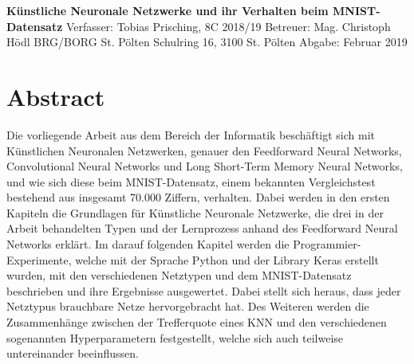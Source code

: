 \documentclass[a4paper,12pt,ngerman,oneside]{scrreprt}	%
\begin{document}
	

	\begin{titlepage}\label{Titleseite}
		
		\vspace*{80mm}\Huge\centering\textbf{Künstliche Neuronale Netzwerke \newline und ihr Verhalten beim MNIST-Datensatz\break}
		\vspace{0mm}\hrulefill
		\vspace{7mm}\Large{\break Verfasser: Tobias Prisching, 8C 2018/19 \break Betreuer: Mag. Christoph Hödl}
		\vspace{15mm}\Large{\break BRG/BORG St. Pölten \break Schulring 16, 3100 St. Pölten}
		\vspace{70mm}\Large{\break Abgabe: Februar 2019}
		
	\end{titlepage}
	
	
	\renewcommand{\abstractname}{Abstract}	
	\chapter*{Abstract}\label{Abstract}
		Die vorliegende Arbeit aus dem Bereich der Informatik beschäftigt sich mit Künstlichen Neuronalen Netzwerken, genauer den Feedforward Neural Networks, Convolutional Neural Networks und Long Short-Term Memory Neural Networks, und wie sich diese beim MNIST-Datensatz, einem bekannten Vergleichstest bestehend aus insgesamt 70.000 Ziffern, verhalten. Dabei werden in den ersten Kapiteln die Grundlagen für Künstliche Neuronale Netzwerke, die drei in der Arbeit behandelten Typen und der Lernprozess anhand des Feedforward Neural Networks erklärt. Im darauf folgenden Kapitel werden die Programmier-Experimente, welche mit der Sprache Python und der Library Keras erstellt wurden, mit den verschiedenen Netztypen und dem MNIST-Datensatz beschrieben und ihre Ergebnisse ausgewertet. Dabei stellt sich heraus, dass jeder Netztypus brauchbare Netze hervorgebracht hat. Des Weiteren werden die Zusammenhänge zwischen der Trefferquote eines KNN und den verschiedenen sogenannten Hyperparametern festgestellt, welche sich auch teilweise untereinander beeinflussen. 
		\thispagestyle{empty}
	
\end{document}
